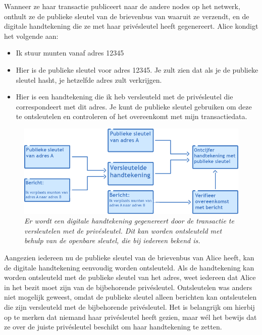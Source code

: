 Wanneer ze haar transactie publiceert naar de andere nodes op het netwerk, onthult ze de publieke sleutel van de brievenbus van waaruit ze verzendt, en de digitale handtekening die ze met haar privésleutel heeft gegenereert. Alice kondigt het volgende aan:

\begin{itemize}
    \item Ik stuur munten vanaf adres 12345
    \item Hier is de publieke sleutel voor adres 12345. Je zult zien dat als je de publieke sleutel hasht, je hetzelfde adres zult verkrijgen.
    \item Hier is een handtekening die ik heb versleuteld met de privésleutel die correspondeert met dit adres. Je kunt de publieke sleutel gebruiken om deze te ontsleutelen en controleren of het overeenkomt met mijn transactiedata.
\end{itemize}

\begin{figure}[h]
    \centering
    \includegraphics[width=\textwidth]{images/fig13.png}
    \caption{\footnotesize{\textit{Er wordt een digitale handtekening gegenereert door de transactie te versleutelen met de privésleutel. Dit kan worden ontsleuteld met behulp van de openbare sleutel, die bij iedereen bekend is.}}}
    \label{fig13}
\end{figure}

Aangezien iedereen nu de publieke sleutel van de brievenbus van Alice heeft, kan de digitale handtekening eenvoudig worden ontsleuteld. Als de handtekening kan worden ontsleuteld met de publieke sleutel van het adres, weet iedereen dat Alice in het bezit moet zijn van de bijbehorende privésleutel. Ontsleutelen was anders niet mogelijk geweest, omdat de publieke sleutel alleen berichten kan ontsleutelen die zijn versleuteld met de bijbehorende privésleutel. Het is belangrijk om hierbij op te merken dat niemand haar privésleutel heeft gezien, maar wél het bewijs dat ze over de juiste privésleutel beschikt om haar handtekening te zetten.

